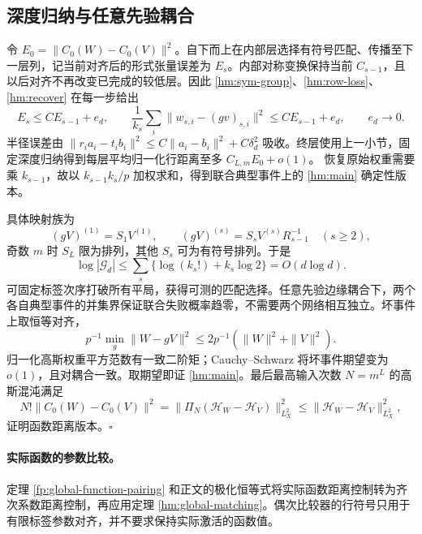 \documentclass[a4paper]{tufte-handout}
\begin{document}
\begin{fullwidth}
\subsection{深度归纳与任意先验耦合}
令 $E_0=\|C_0(W)-C_0(V)\|^2$。自下而上在内部层选择有符号匹配、传播至下一层列，记当前对齐后的形式张量误差为 $E_s$。内部对称变换保持当前 $C_{s-1}$，且以后对齐不再改变已完成的较低层。因此 \eqref{hm:sym-group}、\eqref{hm:row-loss}、\eqref{hm:recover} 在每一步给出
\[
 E_s\le CE_{s-1}+e_d,\qquad
 \frac1{k_s}\sum_i\|w_{s,i}-(gv)_{s,i}\|^2\le CE_{s-1}+e_d,
 \qquad e_d\to0.
\]
半径误差由
$\|r_ia_i-t_ib_i\|^2\le C\|a_i-b_i\|^2+C\delta_d^2$
吸收。终层使用上一小节，固定深度归纳得到每层平均归一化行距离至多 $C_{L,m}E_0+o(1)$。
恢复原始权重需要乘 $k_{s-1}$，故以 $k_{s-1}k_s/p$ 加权求和，得到联合典型事件上的 \eqref{hm:main} 确定性版本。

具体映射族为
\[
 (gV)^{(1)}=S_1V^{(1)},\qquad (gV)^{(s)}=S_sV^{(s)}R_{s-1}^{-1}\quad(s\ge2),
\]
奇数 $m$ 时 $S_L$ 限为排列，其他 $S_s$ 可为有符号排列。于是
\[
 \log|\mathcal G_d|\le\sum_s\{\log(k_s!)+k_s\log2\}=O(d\log d).
\]
可固定标签次序打破所有平局，获得可测的匹配选择。任意先验边缘耦合下，两个各自典型事件的并集界保证联合失败概率趋零，不需要两个网络相互独立。坏事件上取恒等对齐，
\[
 p^{-1}\min_g\|W-gV\|^2\le2p^{-1}(\|W\|^2+\|V\|^2).
\]
归一化高斯权重平方范数有一致二阶矩；Cauchy--Schwarz 将坏事件期望变为 $o(1)$，且对耦合一致。取期望即证 \eqref{hm:main}。最后最高输入次数 $N=m^L$ 的高斯混沌满足
\[
 N!\|C_0(W)-C_0(V)\|^2
 =\|\Pi_N(\mathcal H_W-\mathcal H_V)\|_{L^2_X}^2
 \le\|\mathcal H_W-\mathcal H_V\|_{L^2_X}^2,
\]
证明函数距离版本。\hfill$\square$


\paragraph{实际函数的参数比较。}
定理 \ref{fp:global-function-pairing} 和正文的极化恒等式将实际函数距离控制转为齐次系数距离控制，再应用定理 \ref{hm:global-matching}。偶次比较器的行符号只用于有限标签参数对齐，并不要求保持实际激活的函数值。


\end{fullwidth}
\end{document}
